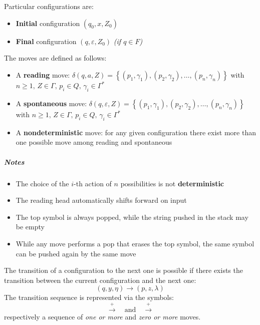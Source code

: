 \documentclass[english]{article}
\begin{document}
Particular configurations are:

\begin{itemize}
  \item \textbf{Initial} configuration \(\left( q_0, x, Z_0 \right)\)
  \item \textbf{Final} configuration \(\left( q, \varepsilon, Z_0 \right)\) \textit{(if \(q \in F\))}
\end{itemize}

\begin{definition}
  The moves are defined as follows:
  \begin{itemize}
    \item A \textbf{reading} move: \(\delta(q, a, Z) = \left\{ (p_1, \gamma_1), (p_2, \gamma_2), \ldots, (p_n, \gamma_n) \right\}\) with \(n \geq 1, \, Z \in \Gamma, \, p_i \in Q, \, \gamma_i \in \Gamma^\ast\)
    \item A \textbf{spontaneous} move: \(\delta(q, \varepsilon, Z) = \left\{ (p_1, \gamma_1), (p_2, \gamma_2), \ldots, (p_n, \gamma_n) \right\}\) with \(n \geq 1, \, Z \in \Gamma, \, p_i \in Q, \, \gamma_i \in \Gamma^\ast\)
    \item A \textbf{nondeterministic} move: for any given configuration there exist more than one possible move among reading and spontaneous
  \end{itemize}
\end{definition}

\subparagraph*{Notes}

\begin{itemize}
  \item The choice of the \(i\)-th action of \(n\) possibilities is not \textbf{deterministic}
  \item The reading head automatically shifts forward on input
  \item The top symbol is always popped, while the string pushed in the stack may be empty
  \item While any move performs a pop that erases the top symbol, the same symbol can be pushed again by the same move
\end{itemize}

\bigskip
The transition of a configuration to the next one is possible if there exists the transition between the current configuration and the next one:
\[ \left( q, y, \eta \right) \rightarrow \left( p, z, \lambda \right) \]
The transition sequence is represented via the symbols:
\[ \xrightarrow{+} \quad \text{and} \quad \xrightarrow{+} \]
respectively a sequence of \textit{one or more} and \textit{zero or more} moves.
\end{document}
